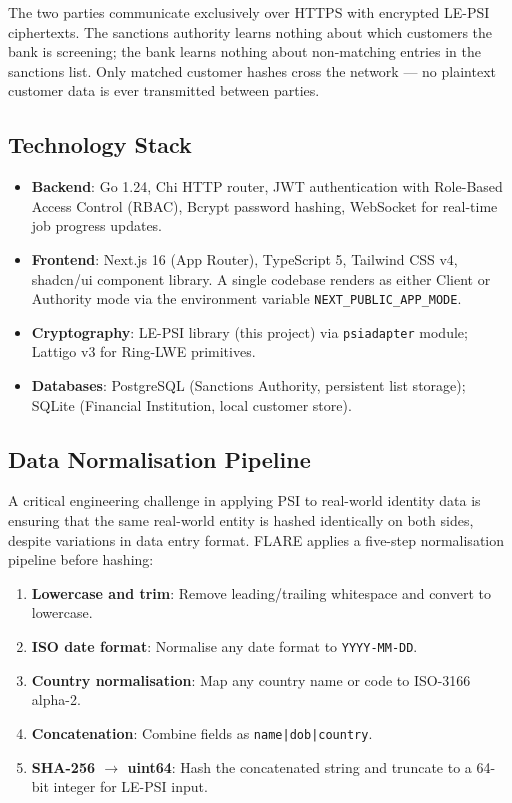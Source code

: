 The two parties communicate exclusively over HTTPS with encrypted LE-PSI ciphertexts.
The sanctions authority learns nothing about which customers the bank is screening;
the bank learns nothing about non-matching entries in the sanctions list. Only matched
customer hashes cross the network --- no plaintext customer data is ever transmitted
between parties.

\subsection{Technology Stack}

\begin{itemize}
  \item \textbf{Backend}: Go 1.24, Chi HTTP router, JWT authentication with Role-Based
        Access Control (RBAC), Bcrypt password hashing, WebSocket for real-time job
        progress updates.
  \item \textbf{Frontend}: Next.js 16 (App Router), TypeScript 5, Tailwind CSS v4,
        shadcn/ui component library. A single codebase renders as either Client or
        Authority mode via the environment variable \texttt{NEXT\_PUBLIC\_APP\_MODE}.
  \item \textbf{Cryptography}: LE-PSI library (this project) via \texttt{psiadapter}
        module; Lattigo v3 for Ring-LWE primitives.
  \item \textbf{Databases}: PostgreSQL (Sanctions Authority, persistent list storage);
        SQLite (Financial Institution, local customer store).
\end{itemize}

\subsection{Data Normalisation Pipeline}

A critical engineering challenge in applying PSI to real-world identity data is ensuring
that the same real-world entity is hashed identically on both sides, despite variations
in data entry format. FLARE applies a five-step normalisation pipeline before hashing:

\begin{enumerate}
  \item \textbf{Lowercase and trim}: Remove leading/trailing whitespace and convert to lowercase.
  \item \textbf{ISO date format}: Normalise any date format to \texttt{YYYY-MM-DD}.
  \item \textbf{Country normalisation}: Map any country name or code to ISO-3166 alpha-2.
  \item \textbf{Concatenation}: Combine fields as \texttt{name|dob|country}.
  \item \textbf{SHA-256 $\to$ uint64}: Hash the concatenated string and truncate to a
        64-bit integer for LE-PSI input.
\end{enumerate}

